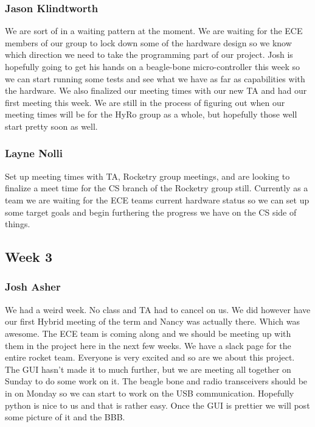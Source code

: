 \documentclass[10pt,draftclsnofoot,onecolumn]{IEEEtran}
\begin{document}
\subsubsection{Jason Klindtworth}
We are sort of in a waiting pattern at the moment. We are waiting for the ECE members of our group to lock down some of the hardware design so we know which direction we need to take the programming part of our project. Josh is hopefully going to get his hands on a beagle-bone micro-controller this week so we can start running some tests and see what we have as far as capabilities with the hardware. We also finalized our meeting times with our new TA and had our first meeting this week. We are still in the process of figuring out when our meeting times will be for the HyRo group as a whole, but hopefully those well start pretty soon as well.  \par

\subsubsection{Layne Nolli}
Set up meeting times with TA, Rocketry group meetings, and are looking to finalize a meet time for the CS branch of the Rocketry group still. Currently as a team we are waiting for the ECE teams current hardware status so we can set up some target goals and begin furthering the progress we have on the CS side of things. \par

\subsection{Week 3}

\subsubsection{Josh Asher}
 We had a weird week. No class and TA had to cancel on us. We did however have our first Hybrid meeting of the term and Nancy was actually there. Which was awesome. The ECE team is coming along and we should be meeting up with them in the project here in the next few weeks. We have a slack page for the entire rocket team. Everyone is very excited and so are we about this project. The GUI hasn't made it to much further, but we are meeting all together on Sunday to do some work on it. The beagle bone and radio transceivers should be in on Monday so we can start to work on the USB communication. Hopefully python is nice to us and that is rather easy. Once the GUI is prettier we will post some picture of it and the BBB. \par
\end{document}
